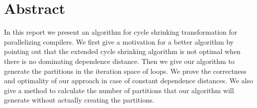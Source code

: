 \chapter*{Abstract}
In this report we present an algorithm for cycle shrinking transformation for parallelizing compilers. We first give a motivation for a better algorithm by pointing out that the extended cycle shrinking algorithm is not optimal when there is no dominating dependence distance. Then we give our algorithm to generate the partitions in the iteration space of loops. We prove the correctness and optimality of our approach in case of constant dependence distances. We also give a method to calculate the number of partitions that our algorithm will generate without actually creating the partitions.
